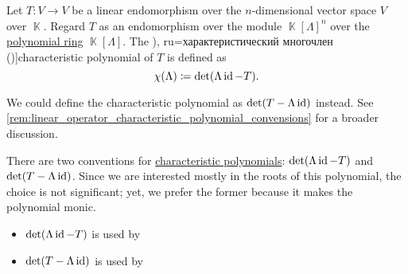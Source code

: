 \begin{definition}\label{def:linear_operator_characteristic_polynomial}
  Let \( T: V \to V \) be a linear endomorphism over the \( n \)-dimensional vector space \( V \) over \( \BbbK \). Regard \( T \) as an endomorphism over the module \( \BbbK[\Lambda]^n \) over the \hyperref[def:polynomial_algebra]{polynomial ring} \( \BbbK[\Lambda] \). The \term[bg=характеристичен полином (\cite[77]{Обрешков1962ВисшаАлгебра}), ru=характеристический многочлен (\cite[def. 6.2.2]{Винберг2014КурсАлгебры})]{characteristic polynomial} of \( T \) is defined as
  \begin{equation*}
    \chi(\Lambda) \coloneqq \det(\Lambda \operatorname{id} - T).
  \end{equation*}
\end{definition}
\begin{comments}
  \item We could define the characteristic polynomial as \( \det(T - \Lambda \operatorname{id}) \) instead. See \cref{rem:linear_operator_characteristic_polynomial_convensions} for a broader discussion.
\end{comments}

\begin{remark}\label{rem:linear_operator_characteristic_polynomial_convensions}
  There are two conventions for \hyperref[def:linear_operator_characteristic_polynomial]{characteristic polynomials}: \( \det(\Lambda \operatorname{id} - T) \) and \( \det(T - \Lambda \operatorname{id}) \). Since we are interested mostly in the roots of this polynomial, the choice is not significant; yet, we prefer the former because it makes the polynomial monic.

  \begin{itemize}
    \item \( \det(\Lambda \operatorname{id} - T) \) is used by

    \item \( \det(T - \Lambda \operatorname{id}) \) is used by
  \end{itemize}
\end{remark}

